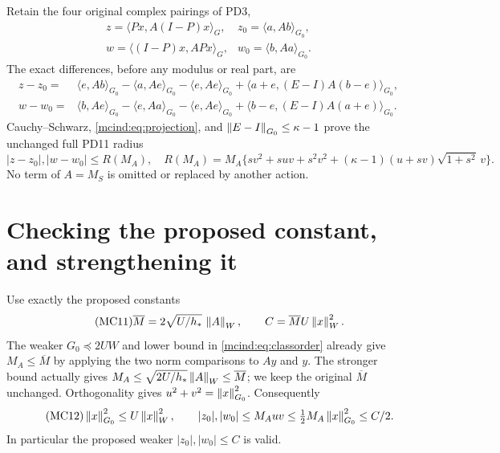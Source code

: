 Retain the four original complex pairings of PD3,
\begin{equation}\tag{MC9}\label{mcind:eq:pairings}
 \begin{array}{ll}
 z=\langle Px,A(I-P)x\rangle_G,&z_0=\langle a,Ab\rangle_{G_0},\\
 w=\langle(I-P)x,APx\rangle_G,&w_0=\langle b,Aa\rangle_{G_0}.
 \end{array}
\end{equation}
The exact differences, before any modulus or real part, are
\[
\begin{split}
 z-z_0={}&\langle e,Ab\rangle_{G_0}-\langle a,Ae\rangle_{G_0}
          -\langle e,Ae\rangle_{G_0}
          +\langle a+e,(E-I)A(b-e)\rangle_{G_0},\\
 w-w_0={}&\langle b,Ae\rangle_{G_0}-\langle e,Aa\rangle_{G_0}
          -\langle e,Ae\rangle_{G_0}
          +\langle b-e,(E-I)A(a+e)\rangle_{G_0}.
\end{split}
\]
Cauchy--Schwarz, \eqref{mcind:eq:projection}, and
$\left\lVert E-I\right\rVert_{G_0}\le\kappa-1$ prove the unchanged full PD11
radius
\begin{equation}\tag{MC10}\label{mcind:eq:radius}
 |z-z_0|,|w-w_0|\le R(M_A),\quad
 R(M_A)=M_A\{sv^2+suv+s^2v^2
              +(\kappa-1)(u+sv)\sqrt{1+s^2}\,v\}.
\end{equation}
No term of $A=M_S$ is omitted or replaced by another action.

\section{Checking the proposed constant, and strengthening it}

Use exactly the proposed constants
\begin{equation}\tag{MC11}\label{mcind:eq:C}
 \overline M=2\sqrt{U/h_*}\,\left\lVert A\right\rVert_W,\qquad
 C=\overline M U\left\lVert x\right\rVert_W^2.
\end{equation}
The weaker $G_0\preceq2UW$ and lower bound in
\eqref{mcind:eq:classorder} already give $M_A\le\overline M$ by
applying the two norm comparisons to $Ay$ and $y$.
The stronger bound actually gives
$M_A\le\sqrt{2U/h_*}\left\lVert A\right\rVert_W\le\overline M$; we keep
the original $\overline M$ unchanged. Orthogonality gives
$u^2+v^2=\left\lVert x\right\rVert_{G_0}^2$. Consequently
\begin{equation}\tag{MC12}\label{mcind:eq:center}
 \left\lVert x\right\rVert_{G_0}^2\le U\left\lVert x\right\rVert_W^2,
 \qquad |z_0|,|w_0|\le M_Auv
                \le\tfrac12M_A\left\lVert x\right\rVert_{G_0}^2\le C/2.
\end{equation}
In particular the proposed weaker $|z_0|,|w_0|\le C$ is valid.

